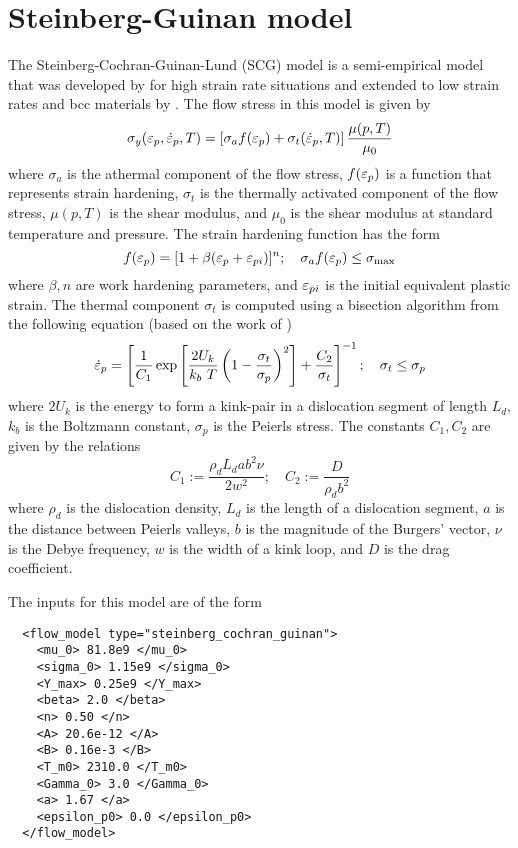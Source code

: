\section{Steinberg-Guinan model}
The Steinberg-Cochran-Guinan-Lund (SCG) model is a semi-empirical model
that was developed by \cite{Steinberg1980} for high strain rate 
situations and extended to low strain rates and bcc materials by
\cite{Steinberg1989}.  The flow stress in this model is given by
\begin{equation}\label{eq:SCGL}
  \sigma_y(\varepsilon_p,\dot{\varepsilon}_{p},T) = 
   \left[\sigma_a f(\varepsilon_p) + \sigma_t (\dot{\varepsilon}_{p}, T)\right]
   \frac{\mu(p,T)}{\mu_0} 
\end{equation}
where $\sigma_a$ is the athermal component of the flow stress,
$f(\varepsilon_p)$ is a function that represents strain hardening,
$\sigma_t$ is the thermally activated component of the flow stress,
$\mu(p,T)$ is the shear modulus, and $\mu_0$ is the shear modulus 
at standard temperature and pressure.  The strain hardening function
has the form
\begin{equation}
  f(\varepsilon_p) = [1 + \beta(\varepsilon_p + \varepsilon_{pi})]^n ; \quad
  \sigma_a f(\varepsilon_p) \le \sigma_{\text{max}}
\end{equation}
where $\beta, n$ are work hardening parameters, and $\varepsilon_{pi}$ is the 
initial equivalent plastic strain.  The thermal component $\sigma_t$
is computed using a bisection algorithm from the following equation (based 
on the work of \cite{Hoge1977})
\begin{equation}
  \dot{\varepsilon}_{p} = \left[\frac{1}{C_1}\exp\left[\frac{2U_k}{k_b~T}
    \left(1 - \frac{\sigma_t}{\sigma_p}\right)^2\right] + 
    \frac{C_2}{\sigma_t}\right]^{-1}; \quad
  \sigma_t \le \sigma_p
\end{equation}
where $2 U_k$ is the energy to form a kink-pair in a dislocation segment
of length $L_d$, $k_b$ is the Boltzmann constant, $\sigma_p$ is the Peierls
stress. The constants $C_1, C_2$ are given by the relations
\begin{equation}
  C_1 := \frac{\rho_d L_d a b^2 \nu}{2 w^2}; \quad
  C_2 := \frac{D}{\rho_d b^2}
\end{equation}
where $\rho_d$ is the dislocation density, $L_d$ is the length of a 
dislocation segment, $a$ is the distance between Peierls valleys, 
$b$ is the magnitude of the Burgers' vector, $\nu$ is the Debye frequency,
$w$ is the width of a kink loop, and $D$ is the drag coefficient.

The inputs for this model are of the form
\lstset{language=XML}
\begin{lstlisting}
  <flow_model type="steinberg_cochran_guinan">
    <mu_0> 81.8e9 </mu_0>
    <sigma_0> 1.15e9 </sigma_0>
    <Y_max> 0.25e9 </Y_max>
    <beta> 2.0 </beta>
    <n> 0.50 </n>
    <A> 20.6e-12 </A>
    <B> 0.16e-3 </B>
    <T_m0> 2310.0 </T_m0>
    <Gamma_0> 3.0 </Gamma_0>
    <a> 1.67 </a>
    <epsilon_p0> 0.0 </epsilon_p0>
  </flow_model>
\end{lstlisting}

